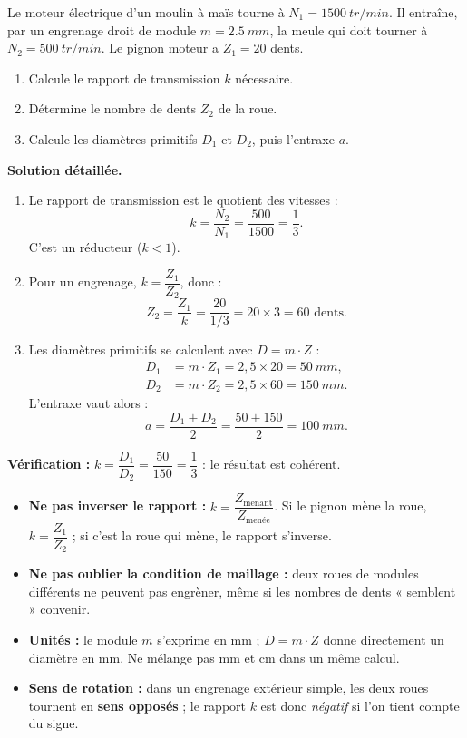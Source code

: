 \documentclass[11pt]{article}
\begin{document}
\begin{exoresolu}
Le moteur électrique d'un moulin à maïs tourne à $N_1 = \SI{1500}{tr/min}$. Il entraîne, par un engrenage droit de module $m = \SI{2,5}{mm}$, la meule qui doit tourner à $N_2 = \SI{500}{tr/min}$. Le pignon moteur a $Z_1 = 20$ dents.
\begin{enumerate}
\item Calcule le rapport de transmission $k$ nécessaire.
\item Détermine le nombre de dents $Z_2$ de la roue.
\item Calcule les diamètres primitifs $D_1$ et $D_2$, puis l'entraxe $a$.
\end{enumerate}
\tcblower
\textbf{Solution détaillée.}
\begin{enumerate}
\item Le rapport de transmission est le quotient des vitesses :
\[ k = \dfrac{N_2}{N_1} = \dfrac{500}{1500} = \dfrac{1}{3}. \]
C'est un réducteur ($k < 1$).
\item Pour un engrenage, $k = \dfrac{Z_1}{Z_2}$, donc :
\[ Z_2 = \dfrac{Z_1}{k} = \dfrac{20}{1/3} = 20 \times 3 = 60 \text{ dents}. \]
\item Les diamètres primitifs se calculent avec $D = m \cdot Z$ :
\begin{align*}
D_1 &= m \cdot Z_1 = 2{,}5 \times 20 = \SI{50}{mm},\\
D_2 &= m \cdot Z_2 = 2{,}5 \times 60 = \SI{150}{mm}.
\end{align*}
L'entraxe vaut alors :
\[ a = \dfrac{D_1 + D_2}{2} = \dfrac{50 + 150}{2} = \SI{100}{mm}. \]
\end{enumerate}
\textbf{Vérification :} $k = \dfrac{D_1}{D_2} = \dfrac{50}{150} = \dfrac{1}{3}$ : le résultat est cohérent.
\end{exoresolu}

\begin{attention}
\begin{itemize}
\item \textbf{Ne pas inverser le rapport :} $k = \dfrac{Z_{\text{menant}}}{Z_{\text{menée}}}$. Si le pignon mène la roue, $k = \dfrac{Z_1}{Z_2}$ ; si c'est la roue qui mène, le rapport s'inverse.
\item \textbf{Ne pas oublier la condition de maillage :} deux roues de modules différents ne peuvent pas engrèner, même si les nombres de dents « semblent » convenir.
\item \textbf{Unités :} le module $m$ s'exprime en mm ; $D = m \cdot Z$ donne directement un diamètre en mm. Ne mélange pas mm et cm dans un même calcul.
\item \textbf{Sens de rotation :} dans un engrenage extérieur simple, les deux roues tournent en \textbf{sens opposés} ; le rapport $k$ est donc \emph{négatif} si l'on tient compte du signe.
\end{itemize}
\end{attention}
\end{document}
